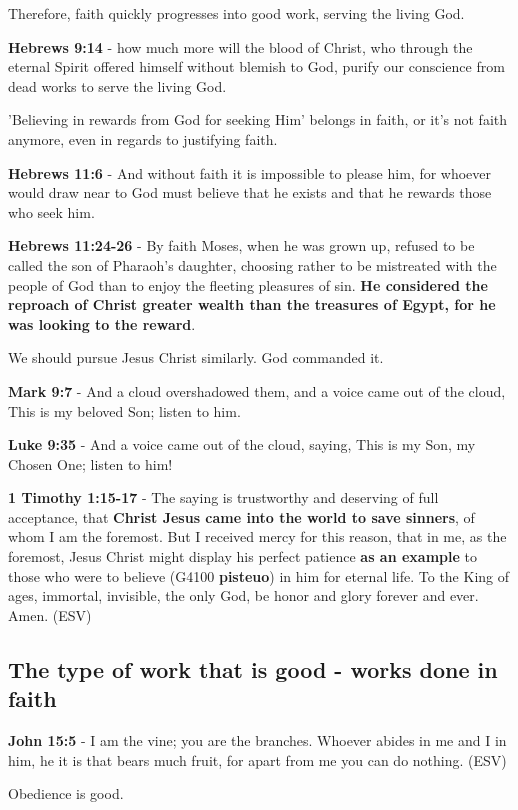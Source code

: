 \documentclass[11pt]{article}
\begin{document}
Therefore, faith quickly progresses into good work, serving the living God.

\textbf{Hebrews 9:14} - how much more will the blood of Christ, who through the eternal Spirit offered himself without blemish to God, purify our conscience from dead works to serve the living God.

'Believing in rewards from God for seeking Him' belongs in faith, or it's not faith anymore, even in regards to justifying faith.

\textbf{Hebrews 11:6} - And without faith it is impossible to please him, for whoever would draw near to God must believe that he exists and that he rewards those who seek him.

\textbf{Hebrews 11:24-26} - By faith Moses, when he was grown up, refused to be called the son of Pharaoh's daughter, choosing rather to be mistreated with the people of God than to enjoy the fleeting pleasures of sin. \textbf{He considered the reproach of Christ greater wealth than the treasures of Egypt, for he was looking to the reward}.

We should pursue Jesus Christ similarly. God commanded it.

\textbf{Mark 9:7} - And a cloud overshadowed them, and a voice came out of the cloud, This is my beloved Son; listen to him.

\textbf{Luke 9:35} - And a voice came out of the cloud, saying, This is my Son, my Chosen One; listen to him!

\textbf{1 Timothy 1:15-17} - The saying is trustworthy and deserving of full acceptance, that \textbf{Christ Jesus came into the world to save sinners}, of whom I am the foremost. But I received mercy for this reason, that in me, as the foremost, Jesus Christ might display his perfect patience \textbf{as an example} to those who were to believe (G4100 \textbf{pisteuo}) in him for eternal life. To the King of ages, immortal, invisible, the only God, be honor and glory forever and ever. Amen. (ESV)

\subsection{The type of work that is good - works done in faith}
\label{sec:org8359e44}
\textbf{John 15:5} - I am the vine; you are the branches. Whoever abides in me and I in him, he it is that bears much fruit, for apart from me you can do nothing. (ESV)

Obedience is good.
\end{document}
